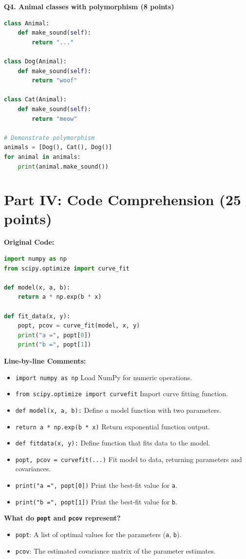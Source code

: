 \documentclass[12pt]{article}
\begin{document}
\textbf{Q4. Animal classes with polymorphism (8 points)}
\begin{lstlisting}[language=Python]
class Animal:
    def make_sound(self):
        return "..."

class Dog(Animal):
    def make_sound(self):
        return "woof"

class Cat(Animal):
    def make_sound(self):
        return "meow"

# Demonstrate polymorphism
animals = [Dog(), Cat(), Dog()]
for animal in animals:
    print(animal.make_sound())
\end{lstlisting}

\newpage
\section*{Part IV: Code Comprehension (25 points)}

\textbf{Original Code:}
\begin{lstlisting}[language=Python]
import numpy as np
from scipy.optimize import curve_fit

def model(x, a, b):
    return a * np.exp(b * x)

def fit_data(x, y):
    popt, pcov = curve_fit(model, x, y)
    print("a =", popt[0])
    print("b =", popt[1])
\end{lstlisting}

\textbf{Line-by-line Comments:}
\begin{itemize}
\item \texttt{import numpy as np} Load NumPy for numeric operations.
\item \texttt{from scipy.optimize import curvefit} Import curve fitting function.
\item \texttt{def model(x, a, b):} Define a model function with two parameters.
\item \texttt{return a * np.exp(b * x)} Return exponential function output.
\item \texttt{def fitdata(x, y):} Define function that fits data to the model.
\item \texttt{popt, pcov = curvefit(...)} Fit model to data, returning parameters and covariances.
\item \texttt{print("a =", popt[0])} Print the best-fit value for \texttt{a}.
\item \texttt{print("b =", popt[1])} Print the best-fit value for \texttt{b}.
\end{itemize}

\textbf{What do \texttt{popt} and \texttt{pcov} represent?}
\begin{itemize}
\item \texttt{popt}: A list of optimal values for the parameters (\texttt{a}, \texttt{b}).
\item \texttt{pcov}: The estimated covariance matrix of the parameter estimates.
\end{itemize}
\end{document}

